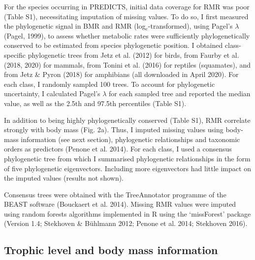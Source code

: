 For the species occurring in PREDICTS, initial data coverage for RMR was poor (Table S1), necessitating imputation of missing values. To do so, I first measured the phylogenetic signal in BMR and RMR (log$_e$-transformed), using Pagel’s $\lambda$ (Pagel, 1999), to assess whether metabolic rates were sufficiently phylogenetically conserved to be estimated from species phylogenetic position. I obtained class-specific phylogenetic trees from Jetz et al. (2012) for birds, from Faurby et al. (2018, 2020) for mammals, from Tonini et al. (2016) for reptiles (squamates), and from Jetz \& Pyron (2018) for amphibians (all downloaded in April 2020). For each class, I randomly sampled 100 trees. To account for phylogenetic uncertainty, I calculated Pagel’s $\lambda$ for each sampled tree and reported the median value, as well as the 2.5th and 97.5th percentiles (Table S1).  

In addition to being highly phylogenetically conserved (Table S1), RMR correlate strongly with body mass (Fig. 2a). Thus, I imputed missing values using body-mass information (see next section), phylogenetic relationships and taxonomic orders as predictors (Penone et al. 2014). For each class, I used a consensus phylogenetic tree from which I summarised phylogenetic relationships in the form of five phylogenetic eigenvectors. Including more eigenvectors had little impact on the imputed values (results not shown). 
\begin{comment} For instance, after re-imputing the values using 10 eigenvectors, the correlation coefficient between the values imputed with 5 eigenvectors and with 10 eigenvectors was 0.997, showing high levels of congruence between the imputed values, regardless of the number of eigenvectors). 
\end{comment}
Consensus trees were obtained with the TreeAnnotator programme of the BEAST software (Bouckaert et al. 2014). Missing RMR values were imputed using random forests algorithms implemented in R using the ‘missForest’ package (Version 1.4; Stekhoven \& Bühlmann 2012; Penone et al. 2014; Stekhoven 2016).  

\subsection{Trophic level and body mass information}

